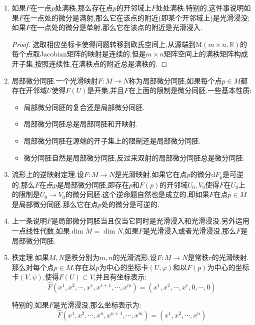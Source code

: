 \begin{enumerate}
	\item 如果$F$在一点$p$处满秩,那么存在点$p$的开邻域上$F$处处满秩.特别的,这件事说明如果$F$在一点处的微分是满射,那么它在该点的附近(即某个开邻域上)是光滑浸没;如果$F$在一点处的微分是单射,那么它在该点的附近是光滑浸入.
	\begin{proof}
		
		选取相应坐标卡使得问题转移到欧氏空间上,从源端到$\mathrm{M}(m\times n,\mathbb{R})$的每个点取Jacobian矩阵的映射是连续的,但是$m\times n$矩阵空间上的满秩矩阵构成开子集,按照连续性,在满秩点的附近总是满秩的.
	\end{proof}
    \item 局部微分同胚.一个光滑映射$F:M\to N$称为局部微分同胚,如果每个点$p\in M$都存在开邻域$U$使得$F(U)$是开集,并且$F$在上面的限制是微分同胚.一些基本性质:
    \begin{itemize}
    	\item 局部微分同胚的复合还是局部微分同胚.
    	\item 局部微分同胚总是局部同胚和开映射.
    	\item 局部微分同胚在源端的开子集上的限制还是局部微分同胚.
    	\item 微分同胚自然是局部微分同胚,反过来双射的局部微分同胚总是微分同胚.
    \end{itemize}
    \item 流形上的逆映射定理.设$F:M\to N$是光滑映射,如果它在点$p$的微分$\mathrm{d}F_p$是可逆的,那么$F$在点$p$是局部微分同胚,即存在$p$和$F(p)$的开邻域$U_0,V_0$使得$F$在$U_0$上的限制是$U_0\to V_0$的微分同胚.这个逆命题自然也是成立的,即如果$F$在点$p\in M$是局部微分同胚,那么它在点$p$处的微分是可逆的.
    \item 上一条说明$F$是局部微分同胚当且仅当它同时是光滑浸入和光滑浸没.另外运用一点线性代数,如果$\dim M=\dim N$,如果$F$是光滑浸入或者光滑浸没,那么$F$是局部微分同胚.
    \item 秩定理.如果$M,N$是秩分别为$m,n$的光滑流形,设$F:M\to N$是常秩$r$的光滑映射.那么对每个点$p\in M$,存在以$p$为中心的坐标卡$(U,\varphi)$和以$F(p)$为中心的坐标卡$(V,\psi)$,使得$F(U)\subset V$,并且有坐标表示:
    $$\hat{F}(x^1,x^2,\cdots,x^r,x^{r+1},\cdots,x^m)=(x^1,x^2,\cdots,x^r,0,\cdots,0)$$
    
    特别的,如果$F$是光滑浸没,那么坐标表示为:
    $$\hat{F}(x^1,x^2,\cdots,x^n,x^{n+1},\cdots,x^m)=(x^1,x^2,\cdots,x^n)$$
    

\end{enumerate}

